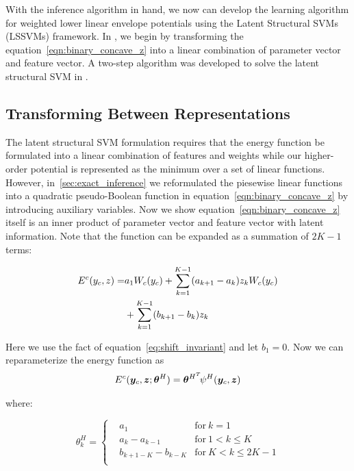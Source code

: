 With the inference algorithm in hand, we now can develop the
learning algorithm for weighted lower linear envelope potentials
using the Latent Structural SVMs (LSSVMs) framework. In
, we begin by transforming the
equation~\eqref{eqn:binary_concave_z} into a linear combination
of parameter vector and feature vector. A two-step algorithm was
developed to solve the latent structural SVM in
.


\subsection{Transforming Between Representations}
\label{sec:learning}

The latent structural SVM formulation requires that the energy
function be formulated into a linear combination of features and
weights while our higher-order potential is represented as the
minimum over a set of linear functions. However,
in~\ref{sec:exact_inference} we reformulated the piesewise linear
functions into a quadratic pseudo-Boolean function in
equation~\eqref{eqn:binary_concave_z} by introducing auxiliary
variables. Now we show equation~\eqref{eqn:binary_concave_z}
itself is an inner product of parameter vector and feature vector
with latent information. Note that the function can be expanded
as a summation of $2K-1$ terms:

\begin{align}
  \label{eq:originalenergy}
  E^c(y_c,z)
  =&a_1W_c(y_c)+\sum_{k=1}^{K-1}(a_{k+1}-a_k)z_kW_c(y_c) \notag \\
   &+\sum_{k=1}^{K-1}(b_{k+1}-b_k)z_k
\end{align}

Here we use the fact of equation~\eqref{eq:shift_invariant} and
let $b_1=0$. Now we can reparameterize the energy function
as
\begin{align}
  \label{eq:llsvm_innerprod_energy}
  E^c({\bm{y}}_c,{\bm{z}}; {\bm{\theta}}^H) = {\bm{\theta}}^{H^T} \! \psi^H({\bm{y}}_c,{\bm{z}})
\end{align}

\noindent where:

\begin{equation}
\label{eq:llsvm_param}
  \theta_k^H = \left\{
    \begin{aligned}
      & a_1	& \text{for} \ k=1\\
      & a_k-a_{k-1} & \text{for}\ 1< k \leq K\\
      & b_{k+1-K}-b_{k-K} & \text{for} \ K<k\le2K-1\\
    \end{aligned}
  \right.
\end{equation}


